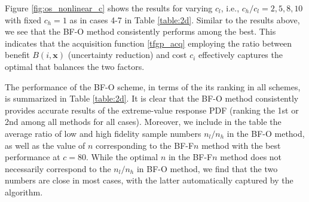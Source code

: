 \documentclass[11pt]{article}
\begin{document}
Figure \ref{fig:os_nonlinear_c} shows the results for varying $c_l$, i.e., $c_h/c_l=2,5,8,10$ with fixed $c_h=1$ as in cases 4-7 in Table \ref{table:2d}. Similar to the results above, we see that the BF-O method consistently performs among the best. This indicates that the acquisition function \eqref{tfgp_acq} employing the ratio between benefit $B(i,\mathbf{x})$ (uncertainty reduction) and cost $c_i$ effectively captures the optimal that balances the two factors. 

The performance of the BF-O scheme, in terms of the its ranking in all schemes, is summarized in Table \ref{table:2d}. It is clear that the BF-O method consistently provides accurate results of the extreme-value response PDF (ranking the 1st or 2nd among all methods for all cases). Moreover, we include in the table the average ratio of low and high fidelity sample numbers $n_l/n_h$ in the BF-O method, as well as the value of $n$ corresponding to the BF-F$n$ method with the best performance at $c=80$. While the optimal $n$ in the BF-F$n$ method does not necessarily correspond to the $n_l/n_h$ in BF-O method, we find that the two numbers are close in most cases, with the latter automatically captured by the algorithm.

\end{document}
